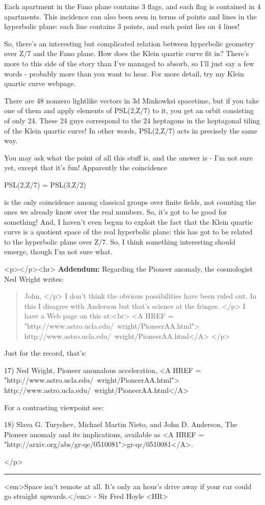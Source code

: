 Each apartment in the Fano plane contains 3 flags, and each flag is contained
in 4 apartments.  This incidence can also been seen in terms of points and lines
in the hyperbolic plane: each line contains 3 points, and each point lies on 4
lines!

So, there's an interesting but complicated relation between hyperbolic geometry
over Z/7 and the Fano plane.  How does the Klein quartic curve fit in?   There's
more to this side of the story than I've managed to absorb, so I'll just say a 
few words - probably more than you want to hear.  For more detail, try my Klein
quartic curve webpage.

There are 48 nonzero lightlike vectors in 3d Minkowksi spacetime, but if you
take one of them and apply elements of PSL(2,Z/7) to it, you get an orbit 
consisting of only 24.  These 24 guys correspond to the 24 heptagons in the 
heptagonal tiling of the Klein quartic curve!  In other words, PSL(2,Z/7)
acts in precisely the same way.   

You may ask what the point of all this stuff is, and the answer is - I'm not
sure yet, except that it's fun!  Apparently the coincidence

PSL(2,Z/7) = PSL(3,Z/2)

is the only coincidence among classical groups over finite fields, not
counting the ones we already know over the real numbers.   So, it's got to be
good for something!  And, I haven't even begun to exploit the fact that
the Klein quartic curve is a quotient space of the real hyperbolic plane:
this has got to be related to the hyperbolic plane over Z/7.  So, I think
something interesting should emerge, though I'm not sure what.
                            

<p></p><hr>
\textbf{Addendum:} Regarding the Pioneer anomaly, 
the cosmologist Ned Wright writes:

\begin{quote}
John, 
</p>
I don't think the obvious possibilities have been ruled out.  In this I
disagree with Anderson but that's science at the fringes.
</p>
I have a Web page on this at:<br>
<A HREF = "http://www.astro.ucla.edu/~wright/PioneerAA.html">
http://www.astro.ucla.edu/~wright/PioneerAA.html</A>
</p>
\end{quote}
    

Just for the record, that's:

17) Ned Wright, Pioneer anomalous acceleration,
<A HREF = "http://www.astro.ucla.edu/~wright/PioneerAA.html">
http://www.astro.ucla.edu/~wright/PioneerAA.html</A>

For a contrasting viewpoint see:

18) Slava G. Turyshev, Michael Martin Nieto, and John D. Anderson,
The Pioneer anomaly and its implications, available as 
<A HREF = "http://arxiv.org/abs/gr-qc/0510081">gr-qc/0510081</A>.


</p>
\par\noindent\rule{\textwidth}{0.4pt}
<em>Space isn't remote at all. It's only an hour's drive away if your 
car could go straight upwards.</em> - Sir Fred Hoyle
<HR>



